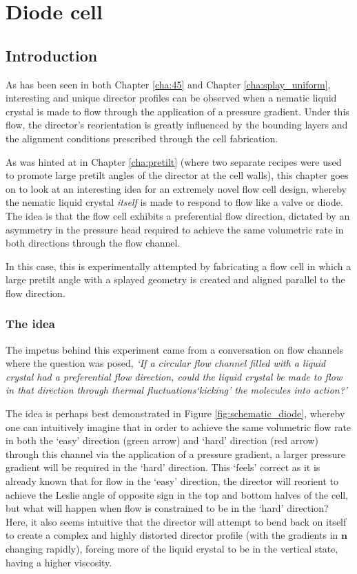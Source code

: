 \chapter{Diode cell}
\label{cha:diode}
\section{Introduction}
As has been seen in both Chapter \ref{cha:45} and Chapter \ref{cha:splay_uniform}, interesting and unique director profiles can be observed when a nematic liquid crystal is made to flow through the application of a pressure gradient. Under this flow, the director's reorientation is greatly influenced by the bounding layers and the alignment conditions prescribed through the cell fabrication.

As was hinted at in Chapter \ref{cha:pretilt} (where two separate recipes were used to promote large pretilt angles of the director at the cell walls), this chapter goes on to look at an interesting idea for an extremely novel flow cell design, whereby the nematic liquid crystal \textit{itself} is made to respond to flow like a valve or diode. The idea is that the flow cell exhibits a preferential flow direction, dictated by an asymmetry in the pressure head required to achieve the same volumetric rate in both directions through the flow channel. 

In this case, this is experimentally attempted by fabricating a flow cell in which a large pretilt angle with a splayed geometry is created and aligned parallel to the flow direction.

\subsection{The idea}
The impetus behind this experiment came from a conversation on flow channels where the question was posed, \textit{`If a circular flow channel filled with a liquid crystal had a preferential flow direction, could the liquid crystal be made to flow in that direction through thermal fluctuations`kicking' the molecules into action?'}

The idea is perhaps best demonstrated in Figure \ref{fig:schematic_diode}, whereby one can intuitively imagine that in order to achieve the same volumetric flow rate in both the `easy' direction (green arrow) and `hard' direction (red arrow) through this channel via the application of a pressure gradient, a larger pressure gradient will be required in the `hard' direction. This `feels' correct as it is already known that for flow in the `easy' direction, the director will reorient to achieve the Leslie angle of opposite sign in the top and bottom halves of the cell, but what will happen when flow is constrained to be in the `hard' direction? Here, it also seems intuitive that the director will attempt to bend back on itself to create a complex and highly distorted director profile (with the gradients in $\bm{n}$ changing rapidly), forcing more of the liquid crystal to be in the vertical state, having a higher viscosity.


